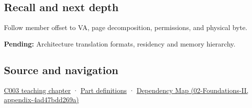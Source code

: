 \subsection{Recall and next depth}\label{appendix-18ee4f913c3c-recall-and-next-depth}

Follow member offset to VA, page decomposition, permissions, and physical byte.

\textbf{Pending:} Architecture translation formats, residency and memory hierarchy.

\subsection{Source and navigation}\label{appendix-18ee4f913c3c-source-and-navigation}

\hyperref[01-foundations-i-ch002-where-the-bytes-live]{C003 teaching chapter} · \hyperref[appendix-fd090d982a15-m003---parts-41-60]{Part definitions} · \href{../02-Foundations-II/main.pdf\#nameddest=appendix-4ad47bdd269a}{Dependency Map (02-Foundations-II, appendix-4ad47bdd269a)}
